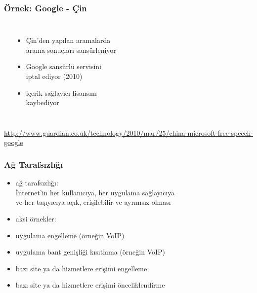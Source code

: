 \documentclass[dvipsnames]{beamer}
\theoremstyle{plain}
\begin{document}
\begin{frame}
  \frametitle{Örnek: Google - Çin}

  \begin{columns}
    \begin{center}
    \end{center}

    \begin{itemize}
      \item Çin'den yapılan aramalarda\\
        arama sonuçları sansürleniyor
      \item Google sansürlü servisini\\
        iptal ediyor (2010)
      \item içerik sağlayıcı lisansını\\
        kaybediyor
    \end{itemize}
  \end{columns}

  \medskip
  \tiny{\url{http://www.guardian.co.uk/technology/2010/mar/25/china-microsoft-free-speech-google}}\\
\end{frame}

\begin{frame}
  \frametitle{Ağ Tarafsızlığı}

  \begin{itemize}
    \item \alert{ağ tarafsızlığı}:\\
      İnternet'in her kullanıcıya, her uygulama sağlayıcıya\\
      ve her taşıyıcıya açık, erişilebilir ve ayrımsız olması

    \medskip
    \item aksi örnekler:
    \item uygulama engelleme (örneğin VoIP)
    \item uygulama bant genişliği kısıtlama (örneğin VoIP)
    \item bazı site ya da hizmetlere erişimi engelleme
    \item bazı site ya da hizmetlere erişimi önceliklendirme
  \end{itemize}
\end{frame}
\end{document}

